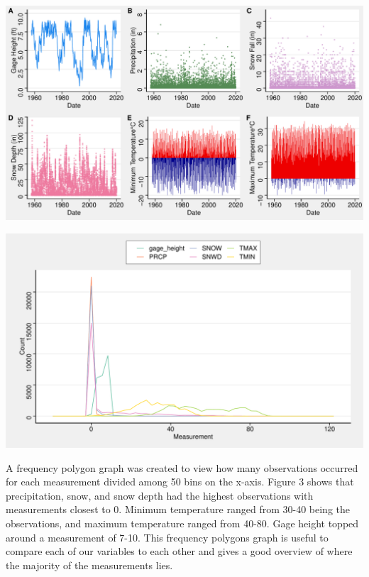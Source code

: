 \documentclass[12pt,]{article}
\let\origfigure\figure
\let\endorigfigure\endfigure
\renewenvironment{figure}[1][2] {
    \expandafter\origfigure\expandafter[H]
} {
    \endorigfigure
}
\begin{document}
\begin{figure}
\centering
\includegraphics{Shintaku_ENV872_Project_files/figure-latex/unnamed-chunk-5-1.pdf}
\caption{Lake Tahoe Gage Height and Climate Data Time Series 1957-2019}
\end{figure}

\begin{figure}
\centering
\includegraphics{Shintaku_ENV872_Project_files/figure-latex/unnamed-chunk-6-1.pdf}
\caption{Frequency Polygons Plot of Gage Height and Climate Data}
\end{figure}

A frequency polygon graph was created to view how many observations
occurred for each measurement divided among 50 bins on the x-axis.
Figure 3 shows that precipitation, snow, and snow depth had the highest
observations with measurements closest to 0. Minimum temperature ranged
from 30-40 being the observations, and maximum temperature ranged from
40-80. Gage height topped around a measurement of 7-10. This frequency
polygons graph is useful to compare each of our variables to each other
and gives a good overview of where the majority of the measurements
lies.
\end{document}
